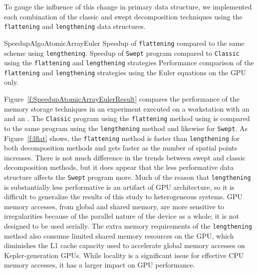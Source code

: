 To gauge the influence of this change in primary data structure, we implemented each combination of the classic and swept decomposition techniques using the \texttt{flattening} and \texttt{lengthening} data structures.


{SpeedupAlgoAtomicArrayEuler}
{Speedup of \texttt{flattening} compared to the same scheme using \texttt{lengthening}.}
{Speedup of \texttt{Swept} program compared to \texttt{Classic} using the \texttt{flattening} and \texttt{lengthening} strategies}
{Performance comparison of the \texttt{flattening} and \texttt{lengthening} strategies using the Euler equations on the GPU only.}


Figure~\ref{f:SpeedupAtomicArrayEulerResult} compares the performance of the memory storage techniques in an
experiment executed on a workstation with an \WCPU{} and an \WGPU{}.
The \texttt{Classic} program using the \texttt{flattening} method using is compared to the same program using the \texttt{lengthening} method and likewise for \texttt{Swept}.
As Figure~\ref{f:lflat} shows, the \texttt{flattening} method is faster than \texttt{lengthening} for both decomposition methods and gets faster as the number of spatial points increases.
There is not much difference in the trends between swept and classic decomposition methods, but it does appear that the less performative data structure affects the \texttt{Swept} program more.
Much of the reason that \texttt{lengthening} is substantially less performative
is an artifact of GPU architecture, so it is difficult to generalize the results of this study to
heterogeneous systems. GPU memory accesses, from global and shared memory, are more sensitive to
irregularities because of the parallel nature of the device as a whole; it is not designed to be used serially.
The extra memory requirements of the \texttt{lengthening} method also consume limited shared memory
resources on the GPU, which diminishes the L1 cache capacity used to accelerate global memory accesses
on Kepler-generation GPUs.
While locality is a significant issue for effective CPU memory accesses, it has a larger impact on GPU performance.

